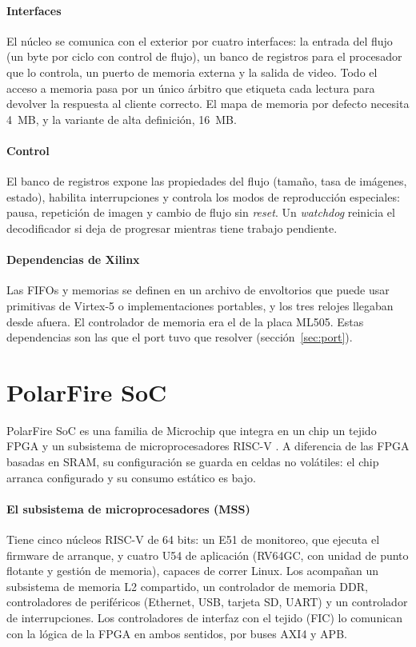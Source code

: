 \paragraph{Interfaces}
El núcleo se comunica con el exterior por cuatro interfaces: la entrada del
flujo (un byte por ciclo con control de flujo), un banco de registros para el
procesador que lo controla, un puerto de memoria externa y la salida de
video. Todo el acceso a memoria pasa por un único árbitro que etiqueta cada
lectura para devolver la respuesta al cliente correcto. El mapa de memoria
por defecto necesita 4~MB, y la variante de alta definición, 16~MB.

\paragraph{Control}
El banco de registros expone las propiedades del flujo (tamaño, tasa de
imágenes, estado), habilita interrupciones y controla los modos de
reproducción especiales: pausa, repetición de imagen y cambio de flujo sin
\emph{reset}. Un \emph{watchdog} reinicia el decodificador si deja de
progresar mientras tiene trabajo pendiente.

\paragraph{Dependencias de Xilinx}
Las FIFOs y memorias se definen en un archivo de envoltorios que puede usar
primitivas de Virtex-5 o implementaciones portables, y los tres relojes
llegaban desde afuera. El controlador de memoria era el de la placa ML505.
Estas dependencias son las que el port tuvo que resolver
(sección~\ref{sec:port}).

\section{PolarFire SoC}
\label{sec:polarfire}

PolarFire SoC es una familia de Microchip que integra en un chip un tejido
FPGA y un subsistema de microprocesadores RISC-V
\citep{Microchip_MSS_TRM}. A diferencia de las FPGA basadas en SRAM, su
configuración se guarda en celdas no volátiles: el chip arranca configurado
y su consumo estático es bajo.

\paragraph{El subsistema de microprocesadores (MSS)}
Tiene cinco núcleos RISC-V de 64 bits: un E51 de monitoreo, que ejecuta el
firmware de arranque, y cuatro U54 de aplicación (RV64GC, con unidad de
punto flotante y gestión de memoria), capaces de correr Linux. Los acompañan
un subsistema de memoria L2 compartido, un controlador de memoria DDR,
controladores de periféricos (Ethernet, USB, tarjeta SD, UART) y un
controlador de interrupciones. Los controladores de interfaz con el tejido
(FIC) lo comunican con la lógica de la FPGA en ambos sentidos, por buses
AXI4 y APB.


